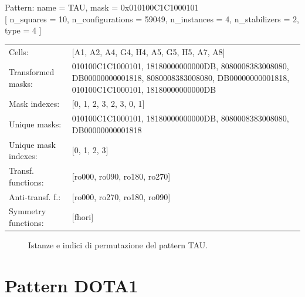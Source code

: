 \begin{tcolorbox}[sharp corners, fontupper=\ttfamily\small, colback=white]
  \noindent Pattern: name = TAU, mask = 0x010100C1C1000101\\
  {[} n\_squares = 10, n\_configurations = 59049,
  n\_instances = 4, n\_stabilizers = 2, type = 4 { ]}\\[1.0ex]
  \begin{tabularx}{\textwidth}{@{} p{3.5cm} X @{}}
    Cells:               & {[}A1, A2, A4, G4, H4, A5, G5, H5, A7, A8{]}\\[0.5ex]
    Transformed masks:   & 010100C1C1000101, 18180000000000DB, 8080008383008080, DB00000000001818, 8080008383008080, DB00000000001818, 010100C1C1000101, 18180000000000DB\\[0.5ex]
    Mask indexes:        & {[}0, 1, 2, 3, 2, 3, 0, 1{]}\\[0.5ex]
    Unique masks:        & 010100C1C1000101, 18180000000000DB, 8080008383008080, DB00000000001818\\[0.5ex]
    Unique mask indexes: & {[}0, 1, 2, 3{]}\\[0.5ex]
    Transf. functions:   & {[}ro000, ro090, ro180, ro270{]}\\[0.5ex]
    Anti-transf. f.:     & {[}ro000, ro270, ro180, ro090{]}\\[0.5ex]
    Symmetry functions:  & {[}fhori{]}\\[0.5ex]
  \end{tabularx}
\end{tcolorbox}

\begin{figure}[htbp]
  \centering
   \hfill
   \hfill
   \hfill
  \vspace{0.3cm}
   \hfill
   \hfill
   \hfill
  \caption{Istanze e indici di permutazione del pattern TAU.}
\end{figure}

\newpage

\section{Pattern DOTA1}

